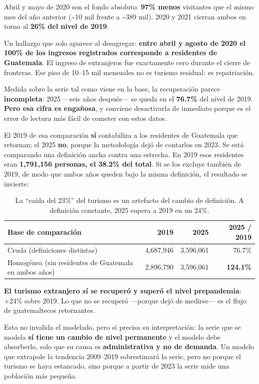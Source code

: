 \documentclass[12pt,letterpaper]{article}
\begin{document}
Abril y mayo de 2020 son el fondo absoluto: \textbf{97\% menos} visitantes que el mismo mes del
año anterior (\textasciitilde10 mil frente a \textasciitilde389 mil). 2020 y 2021 cierran ambos
en torno al \textbf{26\% del nivel de 2019}.

Un hallazgo que solo aparece al desagregar: \textbf{entre abril y agosto de 2020 el 100\% de los
ingresos registrados corresponde a residentes de Guatemala}. El ingreso de extranjeros fue
exactamente cero durante el cierre de fronteras. Ese piso de 10--15 mil mensuales no es turismo
residual: es repatriación.

\label{sec:homog}
Medida sobre la serie tal como viene en la base, la recuperación parece \textbf{incompleta}:
2025 ---seis años después--- se queda en el \textbf{76.7\%} del nivel de 2019. \textbf{Pero esa
cifra es engañosa}, y conviene desactivarla de inmediato porque es el error de lectura más fácil
de cometer con estos datos.

El 2019 de esa comparación \textbf{sí} contabiliza a los residentes de Guatemala que retornan;
el 2025 \textbf{no}, porque la metodología dejó de contarlos en 2023. Se está comparando una
definición ancha contra una estrecha. En 2019 esos residentes eran \textbf{1{,}791{,}156
personas, el 38.2\% del total}. Si se los excluye también de 2019, de modo que ambos años queden
bajo la misma definición, el resultado se invierte:

\begin{table}[H]
\centering
\small
\begin{tabular}{lrrr}
\toprule
\textbf{Base de comparación} & \textbf{2019} & \textbf{2025} & \textbf{2025 / 2019} \\
\midrule
Cruda (definiciones distintas) & 4{,}687{,}946 & 3{,}596{,}061 & 76.7\% \\
Homogénea (sin residentes de Guatemala en ambos años) & 2{,}896{,}790 & 3{,}596{,}061 & \textbf{124.1\%} \\
\bottomrule
\end{tabular}
\caption{La ``caída del 23\%'' del turismo es un artefacto del cambio de definición. A
definición constante, 2025 supera a 2019 en un 24\%.}
\end{table}

\textbf{El turismo extranjero sí se recuperó y superó el nivel prepandemia}: +24\% sobre 2019.
Lo que no se recuperó ---porque dejó de medirse--- es el flujo de guatemaltecos retornantes.

Esto no invalida el modelado, pero sí precisa su interpretación: la serie que se modela
\textbf{sí tiene un cambio de nivel permanente} y el modelo debe absorberlo, solo que su causa
es \textbf{administrativa y no de demanda}. Un modelo que extrapole la tendencia 2009--2019
sobrestimará la serie, pero no porque el turismo se haya estancado, sino porque a partir de 2023
la serie mide una población más pequeña.
\end{document}
